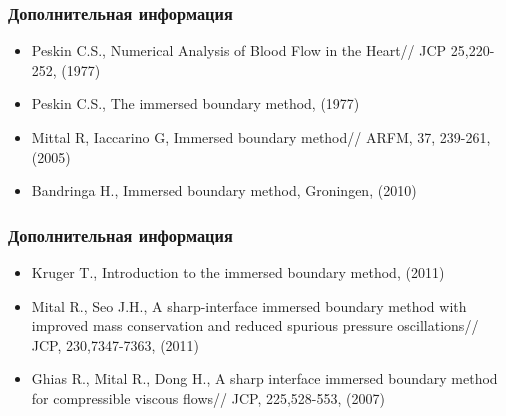 \documentclass[14pt, notes]{beamer}
\begin{document}
\begin{frame}
\frametitle{Дополнительная информация}
    \begin{itemize}
        \item Peskin C.S., Numerical Analysis of Blood Flow in the Heart// JCP 25,220-252, (1977)
        \item Peskin C.S., The immersed boundary method, (1977)
        \item Mittal R, Iaccarino G, Immersed boundary method// ARFM, 37, 239-261, (2005)
        \item Bandringa H., Immersed boundary method, Groningen, (2010)
    \end{itemize}
\end{frame}

\begin{frame}
\frametitle{Дополнительная информация}
    \begin{itemize}
        \item Kruger T., Introduction to the immersed boundary method, (2011)
        \item Mital R., Seo J.H., A sharp-interface immersed boundary method with improved mass conservation and reduced spurious pressure oscillations// JCP, 230,7347-7363, (2011)
        \item Ghias R., Mital R., Dong H., A sharp interface immersed boundary method for compressible viscous flows// JCP, 225,528-553, (2007)
    \end{itemize}
\end{frame}
\end{document}
